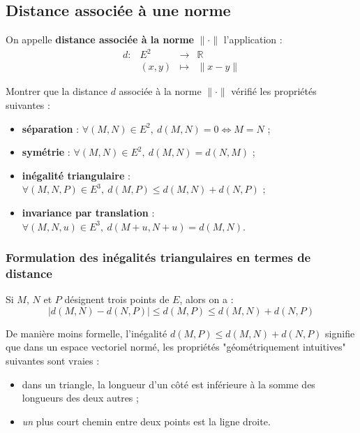 \documentclass[french]{article}
\newcommand{\R}{\mathbb{R}}
\theoremstyle{plain}
\theoremstyle{definition}
\theoremstyle{remark}
\begin{document}
\subsection{Distance associée à une norme}

\begin{dfn}
	On appelle \textbf{distance associée à la norme} $\lVert\cdot\rVert$ l'application : $$\begin{array}{lrcl}
		d:&E^2&\longrightarrow&\R\\
		&(x,y)&\longmapsto&\lVert x-y\rVert
	\end{array}$$
\end{dfn}

\begin{exo}
	Montrer que la distance $d$ associée à la norme $\lVert\cdot\rVert$ vérifié les propriétés suivantes :
	\begin{itemize}
		\item \textbf{séparation} : $\forall (M,N)\in E^2,\ d(M,N)=0\iff M=N$ ;
		\item \textbf{symétrie} : $\forall(M,N)\in E^2,\ d(M,N)=d(N,M)$ ;
		\item \textbf{inégalité triangulaire} : $\forall (M,N,P)\in E^3,\ d(M,P)\leqslant d(M,N)+d(N,P)$ ;
		\item \textbf{invariance par translation} : $\forall (M,N,u)\in E^3,\ d(M+u,N+u)=d(M,N)$.
	\end{itemize}
\end{exo}

\subsubsection*{Formulation des inégalités triangulaires en termes de distance}

\begin{prop}
	Si $M$, $N$ et $P$ désignent trois points de $E$, alors on a : $$\lvert d(M,N)-d(N,P)\rvert\leqslant d(M,P)\leqslant d(M,N)+d(N,P)$$
\end{prop}

De manière moins formelle, l'inégalité $d(M,P)\leqslant d(M,N)+d(N,P)$ signifie que dans un espace vectoriel normé, les propriétés "géométriquement intuitives" suivantes sont vraies :
\begin{itemize}
	\item dans un triangle, la longueur d'un côté est inférieure à la somme des longueurs des deux autres ;
	\item \textit{un} plus court chemin entre deux points est la ligne droite.
\end{itemize}
\end{document}
